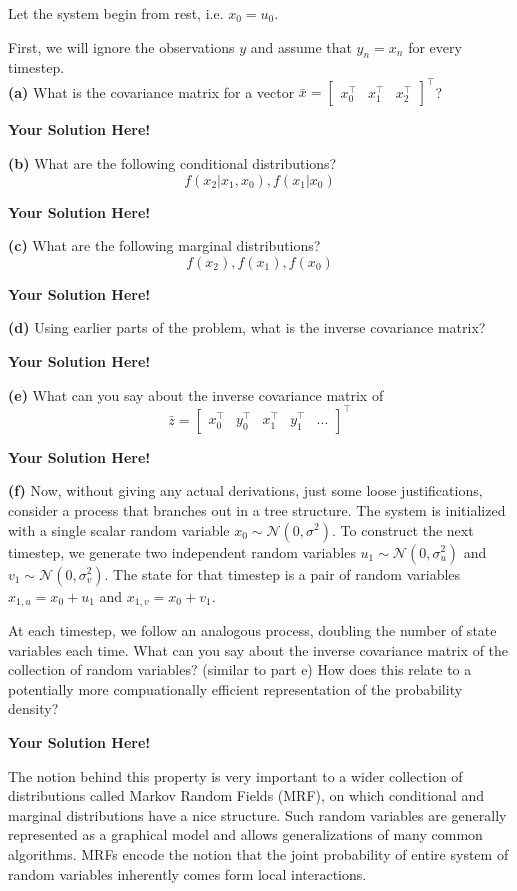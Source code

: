 \documentclass[12pt]{article}
\newcommand{\0}{\mathbf{0}}
\newcommand{\1}{\mathbf{1}}
\newcommand{\solspace}{\vspace{3mm} \textbf{Your Solution Here!} \vspace{3mm}}
\begin{document}
Let the system begin from rest, i.e. $x_0 = u_0$.

First, we will ignore the observations $y$ and assume that $y_n = x_n$ for every timestep. \\

\textbf{(a)} What is the covariance matrix for a vector $\bar x = \begin{bmatrix}
    x_0^\top & x_1^\top & x_2^\top
\end{bmatrix}^\top$?

\solspace

\textbf{(b)} What are the following conditional distributions?
$$f(x_2|x_1, x_0),  f(x_1|x_0)$$

\solspace

\textbf{(c)} What are the following marginal distributions?
$$f(x_2), f(x_1), f(x_0)$$

\solspace

\textbf{(d)} Using earlier parts of the problem, what is the inverse covariance matrix?

\solspace

\textbf{(e)} What can you say about the inverse covariance matrix of 
$$
\bar{z} = 
\begin{bmatrix}
    x_0^\top & y_0^\top & x_1^\top & y_1^\top & ...
\end{bmatrix}^\top
$$

\solspace

\textbf{(f)} Now, without giving any actual derivations, just some loose justifications, consider a process that branches out in a tree structure.
The system is initialized with a single scalar random variable $x_0 \sim \mathcal{N}(0,\sigma^2)$.
To construct the next timestep, we generate two independent random variables $u_1 \sim \mathcal{N}(0,\sigma_u^2)$ and $v_1 \sim \mathcal{N}(0,\sigma_v^2)$. The state for that timestep is a pair of random variables $x_{1,u} = x_0 + u_1$ and $x_{1,v} = x_0 + v_1$.

At each timestep, we follow an analogous process, doubling the number of state variables each time.
What can you say about the inverse covariance matrix of the collection of random variables? (similar to part e)
How does this relate to a potentially more compuationally efficient representation of the probability density?

\solspace

The notion behind this property is very important to a wider collection of distributions called Markov Random Fields (MRF), on which conditional and marginal distributions have a nice structure.
Such random variables are generally represented as a graphical model and allows generalizations of many common algorithms.
MRFs encode the notion that the joint probability of entire system of random variables inherently comes form local interactions.
\end{document}
